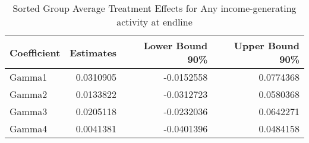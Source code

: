 \begin{table}

\caption{\label{tab:gatesQany_iga}Sorted Group Average Treatment Effects for Any income-generating activity at endline}
\centering
\begin{tabular}[t]{lrrr}
\toprule
Coefficient & Estimates & Lower Bound 90\% & Upper Bound 90\%\\
\midrule
Gamma1 & 0.0310905 & -0.0152558 & 0.0774368\\
Gamma2 & 0.0133822 & -0.0312723 & 0.0580368\\
Gamma3 & 0.0205118 & -0.0232036 & 0.0642271\\
Gamma4 & 0.0041381 & -0.0401396 & 0.0484158\\
\bottomrule
\end{tabular}
\end{table}
